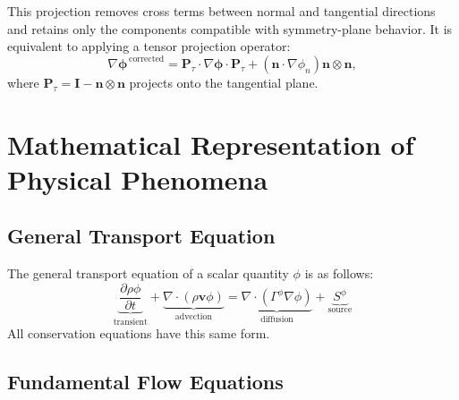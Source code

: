 \documentclass[12pt]{extarticle}
\newcommand{\<}{\langle}
\renewcommand{\>}{\rangle}
\theoremstyle{definition}
\begin{document}
This projection removes cross terms between normal and tangential directions and retains only the components compatible with symmetry-plane behavior. It is equivalent to applying a tensor projection operator:
\[
\nabla \boldsymbol{\phi}^{\,\text{corrected}} = \boldsymbol{P}_\tau \cdot \nabla \boldsymbol{\phi} \cdot \boldsymbol{P}_\tau
+ (\boldsymbol{n} \cdot \nabla \phi_n) \boldsymbol{n} \otimes \boldsymbol{n},
\]
where \( \boldsymbol{P}_\tau = \boldsymbol{I} - \boldsymbol{n} \otimes \boldsymbol{n} \) projects onto the tangential plane.


\section{Mathematical Representation of Physical Phenomena}

\subsection{General Transport Equation}

The general transport equation of a scalar quantity $\phi$ is as follows:
\begin{equation}
    \underbrace{\frac{\partial \rho \phi}{\partial t}}_{\text{transient}} + \underbrace{\nabla \cdot (\rho \textbf{v} \phi)}_{\text{advection}} = \underbrace{\nabla \cdot (\Gamma^{\phi} \nabla \phi)}_{\text{diffusion}} + \underbrace{S^\phi}_{\text{source}} \label{eq:phi_eq}
\end{equation}
All conservation equations have this same form.

\subsection{Fundamental Flow Equations}
\end{document}
